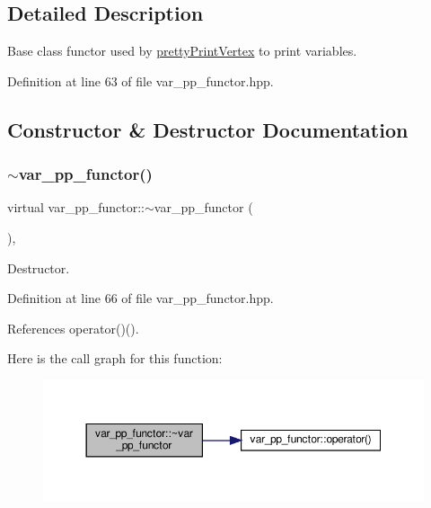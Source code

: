 \subsection{Detailed Description}
Base class functor used by \hyperlink{structprettyPrintVertex}{pretty\+Print\+Vertex} to print variables. 

Definition at line 63 of file var\+\_\+pp\+\_\+functor.\+hpp.



\subsection{Constructor \& Destructor Documentation}
\mbox{\label{structvar__pp__functor_a89bb61a599caec8066ad29dca80ca91f}} 
\subsubsection{\texorpdfstring{$\sim$var\+\_\+pp\+\_\+functor()}{~var\_pp\_functor()}}
{\footnotesize\ttfamily virtual var\+\_\+pp\+\_\+functor\+::$\sim$var\+\_\+pp\+\_\+functor (\begin{DoxyParamCaption}{ }\end{DoxyParamCaption})\hspace{0.3cm}{\ttfamily [inline]}, {\ttfamily [virtual]}}



Destructor. 



Definition at line 66 of file var\+\_\+pp\+\_\+functor.\+hpp.



References operator()().

Here is the call graph for this function\+:
\nopagebreak
\begin{figure}[H]
\begin{center}
\leavevmode
\includegraphics[width=350pt]{d5/d1f/structvar__pp__functor_a89bb61a599caec8066ad29dca80ca91f_cgraph}
\end{center}
\end{figure}


